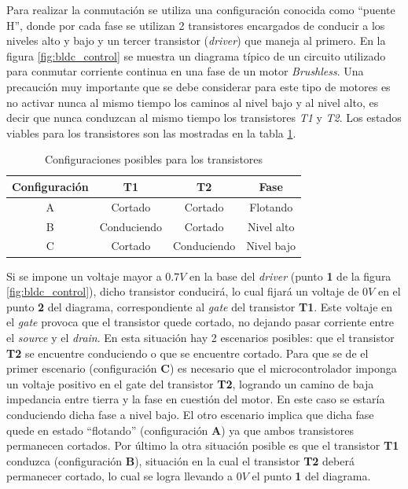 \documentclass[main]{subfiles}
\begin{document}
Para realizar la conmutación se utiliza una configuración conocida como ``puente H'', donde por cada fase se utilizan 2 transistores encargados de conducir a los niveles alto y bajo y un tercer transistor (\emph{driver}) que maneja al primero. En la figura \ref{fig:bldc_control} se muestra un diagrama típico de un circuito utilizado para conmutar corriente continua en una fase de un motor \emph{Brushless}. Una precaución muy importante que se debe considerar para este tipo de motores es no activar nunca al mismo tiempo los caminos al nivel bajo y al nivel alto, es decir que nunca conduzcan al mismo tiempo los transistores \emph{T1} y \emph{T2}. Los estados viables para los transistores son las mostradas en la tabla \ref{tab:estado_transistores}.\\

\begin{table}[H]
\begin{center}
\vspace{-10pt}
\begin{tabular}{|c|c|c|c|}
\hline
\textbf{Configuración} & \textbf{T1} & \textbf{T2} & \textbf{Fase} \\ \hline
A & Cortado & Cortado & Flotando \\
B & Conduciendo & Cortado & Nivel alto \\
C & Cortado & Conduciendo & Nivel bajo \\
\hline
\end{tabular}
\caption{Configuraciones posibles para los transistores}
\vspace{-20pt}
\label{tab:estado_transistores}
\end{center}
\end{table}

Si se impone un voltaje mayor a $0.7 V$ en la base del \emph{driver} (punto \textbf{1} de la figura \ref{fig:bldc_control}), dicho transistor conducirá, lo cual fijará un voltaje de $0V$ en el punto \textbf{2} del diagrama, correspondiente al \emph{gate} del transistor \textbf{T1}. Este voltaje en el \emph{gate} provoca que el transistor quede cortado, no dejando pasar corriente entre el \emph{source} y el \emph{drain}. En esta situación hay 2 escenarios posibles: que el transistor \textbf{T2} se encuentre conduciendo o que se encuentre cortado. Para que se de el primer escenario (configuración \textbf{C}) es necesario que el microcontrolador imponga un voltaje positivo en el gate del transistor \textbf{T2}, logrando un camino de baja impedancia entre tierra y la fase en cuestión del motor. En este caso se estaría conduciendo dicha fase a nivel bajo. El otro escenario implica que dicha fase quede en estado ``flotando'' (configuración \textbf{A}) ya que ambos transistores permanecen cortados. Por último la otra situación posible es que el transistor \textbf{T1} conduzca (configuración \textbf{B}), situación en la cual el transistor \textbf{T2} deberá permanecer cortado, lo cual se logra llevando a $0V$ el punto \textbf{1} del diagrama.\\
\end{document}
